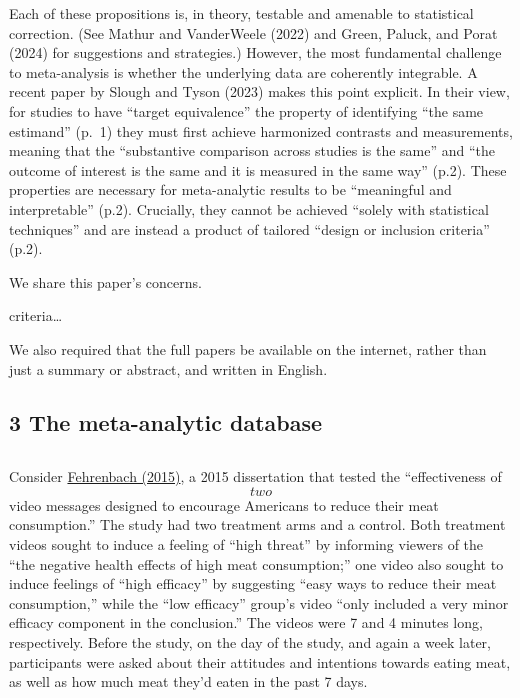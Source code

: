 \documentclass[
  man]{apa6}
\begin{document}
Each of these propositions is, in theory, testable and amenable to statistical correction. (See Mathur and VanderWeele (2022) and Green, Paluck, and Porat (2024) for suggestions and strategies.) However, the most fundamental challenge to meta-analysis is whether the underlying data are coherently integrable. A recent paper by Slough and Tyson (2023) makes this point explicit. In their view, for studies to have ``target equivalence'' \textemdash the property of identifying ``the same estimand'' (p.~1) \textemdash they must first achieve harmonized contrasts and measurements, meaning that the ``substantive comparison across studies is the same'' and ``the outcome of interest is the same and it is measured in the same way'' (p.2). These properties are necessary for meta-analytic results to be ``meaningful and interpretable'' (p.2). Crucially, they cannot be achieved ``solely with statistical techniques'' and are instead a product of tailored ``design or inclusion criteria'' (p.2).

We share this paper's concerns.

criteria\ldots{}

We also required that the full papers be available on the internet, rather than just a summary or abstract, and written in English.

\subsection{3 The meta-analytic database}\label{the-meta-analytic-database}

\subsection{}\label{section}

Consider \href{https://www.proquest.com/docview/1712399091?fromopenview=true&pq-origsite=gscholar}{Fehrenbach (2015)}, a 2015 dissertation that tested the ``effectiveness of \[two\] video messages designed to encourage Americans to reduce their meat consumption.'' The study had two treatment arms and a control. Both treatment videos sought to induce a feeling of ``high threat'' by informing viewers of the ``the negative health effects of high meat consumption;'' one video also sought to induce feelings of ``high efficacy'' by suggesting ``easy ways to reduce their meat consumption,'' while the ``low efficacy'' group's video ``only included a very minor efficacy component in the conclusion.'' The videos were 7 and 4 minutes long, respectively. Before the study, on the day of the study, and again a week later, participants were asked about their attitudes and intentions towards eating meat, as well as how much meat they'd eaten in the past 7 days.
\end{document}

